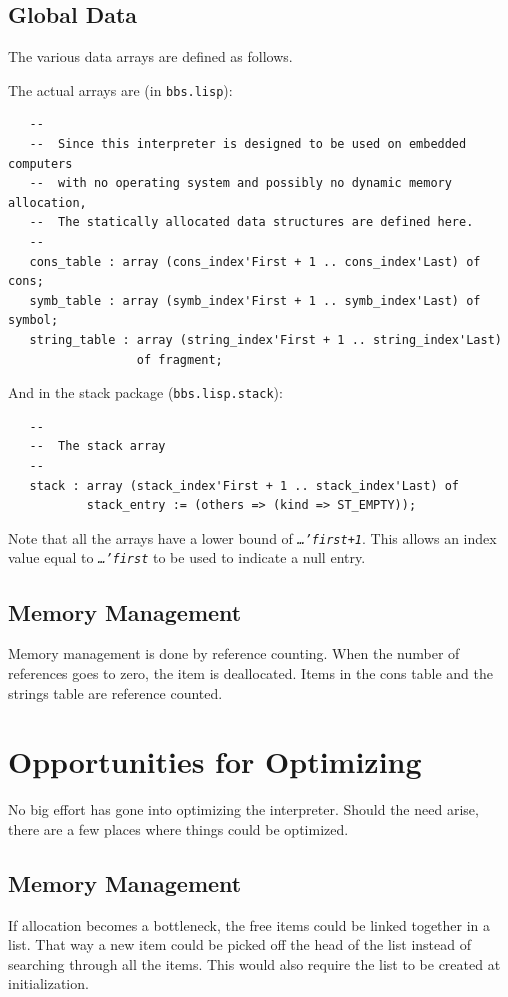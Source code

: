 \documentclass[10pt, openany]{book}
\newcommand{\package}[1]{\texttt{#1}}
\newcommand{\constant}[1]{\emph{\texttt{#1}}}
\begin{document}
\subsection{Global Data}
The various data arrays are defined as follows.

The actual arrays are (in \package{bbs.lisp}):
\begin{lstlisting}
   --
   --  Since this interpreter is designed to be used on embedded computers
   --  with no operating system and possibly no dynamic memory allocation,
   --  The statically allocated data structures are defined here.
   --
   cons_table : array (cons_index'First + 1 .. cons_index'Last) of cons;
   symb_table : array (symb_index'First + 1 .. symb_index'Last) of symbol;
   string_table : array (string_index'First + 1 .. string_index'Last)
                  of fragment;
\end{lstlisting}
And in the stack package (\package{bbs.lisp.stack}):
\begin{lstlisting}
   --
   --  The stack array
   --
   stack : array (stack_index'First + 1 .. stack_index'Last) of
           stack_entry := (others => (kind => ST_EMPTY));
\end{lstlisting}
Note that all the arrays have a lower bound of \constant{\ldots'first+1}.  This allows an index value equal to \constant{\ldots'first} to be used to indicate a null entry.

\subsection{Memory Management}
Memory management is done by reference counting.  When the number of references goes to zero, the item is deallocated.  Items in the cons table and the strings table are reference counted.

\section{Opportunities for Optimizing}
No big effort has gone into optimizing the interpreter.  Should the need arise, there are a few places where things could be optimized.

\subsection{Memory Management}
If allocation becomes a bottleneck, the free items could be linked together in a list.  That way a new item could be picked off the head of the list instead of searching through all the items.  This would also require the list to be created at initialization.
\end{document}
